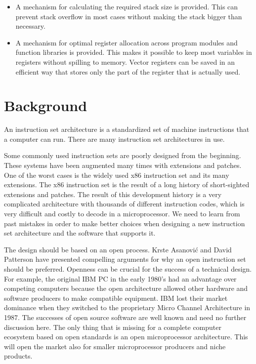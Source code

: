 \documentclass[forwardcom.tex]{subfiles}
\begin{document}
\begin{itemize}
\item A mechanism for calculating the required stack size is provided. This can prevent stack overflow in most cases without making the stack bigger than necessary.

\item A mechanism for optimal register allocation across program modules and function libraries is provided. This makes it possible to keep most variables in registers without spilling to memory. Vector registers can be saved in an efficient way that stores only the part of the register that is actually used.
\end{itemize}


\section{Background}
An instruction set architecture is a standardized set of machine instructions that a computer can run. There are many instruction set architectures in use.
\vspace{2mm}

Some commonly used instruction sets are poorly designed from the beginning. These systems have been augmented many times with extensions and patches. One of the worst cases is the widely used x86 instruction set and its many extensions. The x86 instruction set is the result of a long history of short-sighted extensions and patches. The result of this development history is a very complicated architecture with thousands of different instruction codes, which is very difficult and costly to decode in a microprocessor. We need to learn from past mistakes in order to make better choices when designing a new instruction set architecture and the software that supports it.
\vspace{2mm}

The design should be based on an open process. Krste Asanović and David Patterson have presented compelling arguments for why an open instruction set should be preferred. Openness can be crucial for the success of a technical design. For example, the original IBM PC in the early 1980's had an advantage over competing computers because the open architecture allowed other hardware and software producers to make compatible equipment. IBM lost their market dominance when they switched to the proprietary Micro Channel Architecture in 1987. The successes of open source software are well known and need no further discussion here. The only thing that is missing for a complete computer ecosystem based on open standards is an open microprocessor architecture. This will open the market also for smaller microprocessor producers and niche products.
\vspace{2mm}
\end{document}
